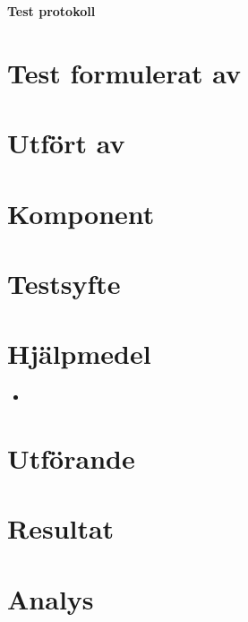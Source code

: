 \documentclass[a4paper]{article}
\begin{document}



\begin{center}
	\LARGE\textbf{Test protokoll}
\end{center}

\begin{multicols}{2}
\section*{Test formulerat av}
\label{sec:formuleratav}



\section*{Utfört av}
\label{sec:namndatum}



\end{multicols}
\section*{Komponent}
\label{sec:komponent}



\section*{Testsyfte}
\label{sec:testsyfte}



\section*{Hjälpmedel}
\label{sec:hjalpmedel}
\begin{itemize}
	\item 
\end{itemize}



\section*{Utförande}
\label{sec:utfarande}



\section*{Resultat}
\label{sec:resultat}



\section*{Analys}
\label{sec:analys}
\end{document}
